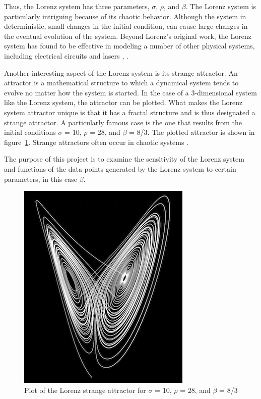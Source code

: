 \documentclass{article}[11pt]
\begin{document}
Thus, the Lorenz system has three parameters, $\sigma$, $\rho$, and $\beta$.  The Lorenz system is particularly intriguing because of its chaotic behavior.  Although the system in deterministic, small changes in the initial condition, can cause large changes in the eventual evolution of the system.  Beyond Lorenz's original work, the Lorenz system has found to be effective in modeling a number of other physical systems, including electrical circuits and lasers \cite{attractor}, \cite{lasers}. 

Another interesting aspect of the Lorenz system is its strange attractor.  An attractor is a mathematical structure to which a dynamical system tends to evolve no matter how the system is started.  In the case of a 3-dimensional system like the Lorenz system, the attractor can be plotted.  What makes the Lorenz system attractor unique is that it has a fractal structure and is thus designated a strange attractor.  A particularly famous case is the one that results from the initial conditions $\sigma$ = 10, $\rho$ = 28, and $\beta$ = 8/3.  The plotted attractor is shown in figure~\ref{fig:lorenz}.  Strange attractors often occur in chaotic systems \cite{Viswanath}.

The purpose of this project is to examine the sensitivity of the Lorenz system and functions of the data points generated by the Lorenz system to certain parameters, in this case $\beta$.

\begin{figure}[H]
\centering
\includegraphics[scale = 0.6]{images/lorenz2.png}
\caption{Plot of the Lorenz strange attractor for $\sigma$ = 10, $\rho$ = 28, and $\beta$ = 8/3 \cite{bourke}}
\label{fig:lorenz}
\end{figure}
\end{document}
